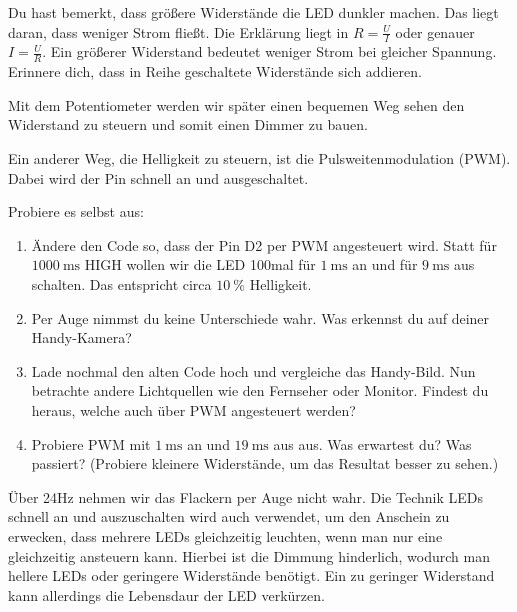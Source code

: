 \documentclass[a4paper,12pt]{book}
\begin{document}
Du hast bemerkt, dass größere Widerstände die LED dunkler machen.
Das liegt daran, dass weniger Strom fließt.
Die Erklärung liegt in $R = \frac{U}{I}$ oder genauer $I = \frac{U}{R}$.
Ein größerer Widerstand bedeutet weniger Strom bei gleicher Spannung.
Erinnere dich, dass in Reihe geschaltete Widerstände sich addieren.

Mit dem Potentiometer werden wir später einen bequemen Weg sehen den Widerstand zu steuern
und somit einen Dimmer zu bauen.

Ein anderer Weg, die Helligkeit zu steuern, ist die Pulsweitenmodulation (PWM).
Dabei wird der Pin schnell an und ausgeschaltet.

\begin{instruction}
  Probiere es selbst aus:
  \begin{enumerate}
    \item Ändere den Code so, dass der Pin D2 per PWM angesteuert wird.
    Statt für $\SI{1000}{\milli\second}$ HIGH wollen wir die LED 100mal für $\SI{1}{\milli\second}$ an und für $\SI{9}{\milli\second}$ aus schalten.
    Das entspricht circa $\SI{10}{\percent}$ Helligkeit.
    \item Per Auge nimmst du keine Unterschiede wahr. Was erkennst du auf deiner Handy-Kamera?
    \item Lade nochmal den alten Code hoch und vergleiche das Handy-Bild. Nun betrachte andere Lichtquellen wie den Fernseher oder Monitor. Findest du heraus, welche auch über PWM angesteuert werden?
    \item Probiere PWM mit $\SI{1}{\milli\second}$ an und $\SI{19}{\milli\second}$ aus aus.
    Was erwartest du? Was passiert? (Probiere kleinere Widerstände, um das Resultat besser zu sehen.)
  \end{enumerate}
\end{instruction}

Über 24Hz nehmen wir das Flackern per Auge nicht wahr.
Die Technik LEDs schnell an und auszuschalten wird auch verwendet, um den Anschein zu erwecken, dass mehrere LEDs gleichzeitig 
leuchten, wenn man nur eine gleichzeitig ansteuern kann.
Hierbei ist die Dimmung hinderlich, wodurch man hellere LEDs oder geringere Widerstände benötigt.
Ein zu geringer Widerstand kann allerdings die Lebensdaur der LED verkürzen.


\end{document}
